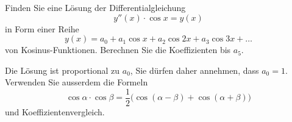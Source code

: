 Finden Sie eine Lösung der Differentialgleichung 
\begin{equation}
y''(x)\cdot\cos x=y(x)
\label{aufgabe3-dgl}
\end{equation}
in Form einer Reihe
\begin{equation}
y(x)
=
a_0 + a_1\cos x + a_2 \cos 2x + a_3 \cos3x+\dots
\label{aufgabe3-ansatz}
\end{equation}
von Kosinus-Funktionen.
Berechnen Sie die Koeffizienten bis $a_5$.

\begin{hinweis}
Die Lösung ist proportional zu $a_0$, Sie dürfen daher annehmen, dass
$a_0=1$.
Verwenden Sie ausserdem die Formeln
\[
\cos\alpha \cdot \cos\beta
=
\frac12\bigl(\cos(\alpha-\beta) + \cos(\alpha+\beta)\bigr)
\]
und Koeffizientenvergleich.
\end{hinweis}


